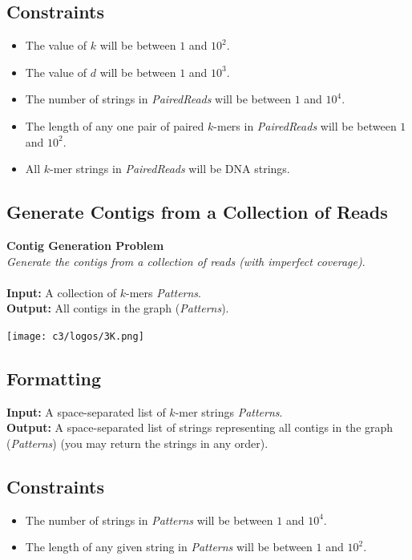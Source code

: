 \documentclass{article}
\renewcommand{\sc}[1]{\text{\scshape #1}}
\begin{document}
\subsection*{Constraints}
\begin{itemize}
    \item The value of $k$ will be between $1$ and $10^2$.
    \item The value of $d$ will be between $1$ and $10^3$.
    \item The number of strings in \emph{PairedReads} will be between $1$ and $10^4$.
    \item The length of any one pair of paired $k$-mers in \emph{PairedReads} will be between $1$ and $10^2$.
    \item All $k$-mer strings in \emph{PairedReads} will be DNA strings.
\end{itemize}
\pagebreak

\subsection{Generate Contigs from a Collection of Reads}
\hline\vspace{5}
\textbf{Contig Generation Problem}\\
\emph{Generate the contigs from a collection of reads (with imperfect coverage)}.\\ \\
\textbf{Input:} A collection of $k$-mers \emph{Patterns}.\\
\textbf{Output:} All contigs in the graph \sc{DeBruijn}(\emph{Patterns}).
\begin{center}
    \texttt{[image: c3/logos/3K.png]}
\end{center}
\hline\vspace{5}

\subsection*{Formatting}
\noindent\textbf{Input:} A space-separated list of $k$-mer strings \emph{Patterns}.\\
\noindent\textbf{Output:} A space-separated list of strings representing all contigs in the graph \sc{DeBruijn}(\emph{Patterns}) (you may return the strings in any order).

\subsection*{Constraints}
\begin{itemize}
    \item The number of strings in \emph{Patterns} will be between $1$ and $10^4$.
    \item The length of any given string in \emph{Patterns} will be between $1$ and $10^2$.
\end{itemize}
\pagebreak
\end{document}

